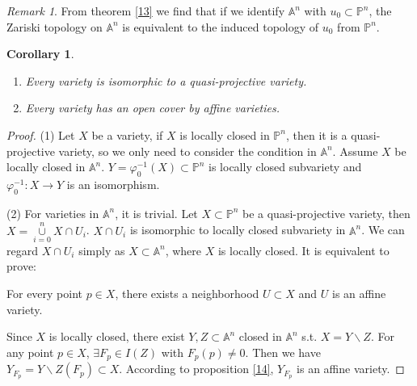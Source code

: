 \documentclass{amsart}
\theoremstyle{plain}
\newtheorem{corollary}{Corollary}
\theoremstyle{definition}
\theoremstyle{remark}
\newtheorem*{remark}{Remark}
\numberwithin{equation}{section}
\begin{document}
\begin{remark}
	From theorem \ref{13} we find that if we identify $ \mathbb{A}^n $ with $ u_0\subset \mathbb{P}^n $, the Zariski topology on $ \mathbb{A}^n $ is equivalent to the induced topology of $ u_0 $ from $ \mathbb{P}^n $.
\end{remark}
\begin{corollary}
	\begin{enumerate}
		\item Every variety is isomorphic to a quasi-projective variety.
		\item Every variety has an open cover by affine varieties.
	\end{enumerate}
\end{corollary}
\begin{proof}
	(1) Let $ X $ be a variety, if $ X $ is locally closed in $ \mathbb{P}^n $,
	then it is  a quasi-projective variety, so we only need to consider the condition in $ \mathbb{A}^n $. Assume $ X $ be locally closed in $ \mathbb{A}^n $. $ Y=\varphi ^{-1}_0 (X) \subset \mathbb{P}^n$ is locally closed subvariety and $ \varphi^{-1}_0 :X\to Y $ is an isomorphism.
	
	(2) For varieties in $ \mathbb{A}^n $, it is trivial. Let $ X\subset \mathbb{P}^n $ be a quasi-projective variety, then $ X=\mathop{\cup}\limits_{i=0}^{n}X\cap U_i $. $ X\cap U_i $ is isomorphic to locally closed subvariety in $ \mathbb{A}^n $. We can regard $ X\cap U_i $ simply as $ X \subset \mathbb{A}^n$, where $ X $ is locally closed. It is equivalent to prove:
	\begin{center}
		For every point $ p\in X $, there exists a neighborhood $ U\subset X $ and $ U $ is an affine variety.
	\end{center}
	Since $ X $ is locally closed, there exist $ Y,Z\subset \mathbb{A}^n $ closed in $ \mathbb{A}^n $ s.t. $ X=Y\backslash Z $. For any point $ p\in X $, $ \exists F_p\in I(Z) $ with $ F_p(p)\neq 0 $. Then we have $ Y_{F_p}=Y\backslash Z(F_p)\subset X $. According to proposition \ref{14}, $ Y_{F_p} $ is an affine variety.
\end{proof}
\end{document}

